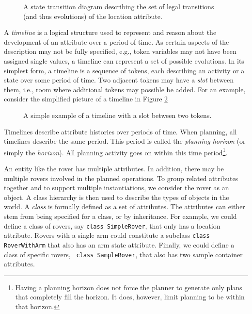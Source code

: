 
\begin{figure}[btph]
\centerline{
}
\caption{\label{goAtStatesFig} A state transition diagram describing the set of legal
transitions (and thus evolutions) of the location
attribute.}
\end{figure}

A {\em timeline} is a logical structure used to represent and reason
about the development of an attribute over a period of time.  As
certain aspects of the description may not be fully specified, e.g.,
token variables may not have been assigned single values, a timeline
can represent a set of possible evolutions.  In its simplest form, a
timeline is a sequence of tokens, each describing an activity or a
state over some period of time.  Two adjacent tokens may have a {\em
slot} between them, i.e., room where additional tokens may possible be
added.  For an example, consider the simplified picture of a timeline
in Figure \ref{simpleTimeline}


\begin{figure}[btph]
\centerline{
}
\caption{\label{simpleTimeline} A simple example of a timeline with a slot between two
tokens.}
\end{figure}


Timelines describe attribute histories over periods of time.  When
planning, all timelines describe the same period.  This period is
called the {\em planning horizon} (or simply the {\em horizon}).  All
planning activity goes on within this time period\footnote{Having a
planning horizon does not force the planner to generate only plans
that completely fill the horizon.  It does, however, limit planning to
be within that horizon.}.



An entity like the rover has multiple attributes.  In addition, there
may be multiple rovers involved in the planned operations.  To group
related attributes together and to support multiple instantiations, we
consider the rover as an object.  A class hierarchy is then used to
describe the types of objects in the world.  A {\em class} is formally
defined as a set of attributes.  The attributes can either stem from
being specified for a class, or by inheritance.  For example, we could
define a class of rovers, say {\tt class SimpleRover}, that only has a
location attribute.  Rovers with a single arm could constitute a
subclass {\tt class RoverWithArm} that also has an arm state
attribute.  Finally, we could define a class of specific rovers, {\tt
class SampleRover}, that also has two sample container attributes.

